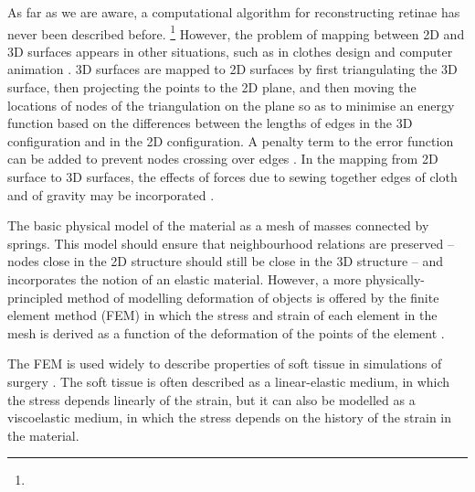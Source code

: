 \documentclass[10pt]{article}
\begin{document}
As far as we are aware, a computational algorithm for reconstructing
retinae has never been described before.
\footnote{} However, the problem
of mapping between 2D and 3D surfaces appears in other situations,
such as in clothes design and computer animation
\cite{FanEtal98spri,MaCaEtal99flat,WangEtal02surf}. 3D surfaces are
mapped to 2D surfaces by first triangulating the 3D surface, then
projecting the points to the 2D plane, and then moving the locations
of nodes of the triangulation on the plane so as to minimise an energy
function based on the differences between the lengths of edges in the
3D configuration and in the 2D configuration. A penalty term to the
error function can be added to prevent nodes crossing over edges
\cite{WangEtal02surf}. In the mapping from 2D surface to 3D surfaces,
the effects of forces due to sewing together edges of cloth and of
gravity may be incorporated \cite{FanEtal98spri}.

The basic physical model of the material as a mesh of masses connected
by springs. This model should ensure that neighbourhood relations are
preserved -- nodes close in the 2D structure should still be close in
the 3D structure -- and incorporates the notion of an elastic
material. However, a more physically-principled method of modelling
deformation of objects is offered by the finite element method (FEM)
in which the stress and strain of each element in the mesh is derived
as a function of the deformation of the points of the element
\cite{ZienTayl00fini}.

The FEM is used widely to describe properties of soft tissue in
simulations of surgery \cite{CartEtal05appl}. The soft tissue is
often described as a linear-elastic medium, in which the stress
depends linearly of the strain, but it can also be modelled as a
viscoelastic medium, in which the stress depends on the history of the
strain in the material. 


\end{document}
